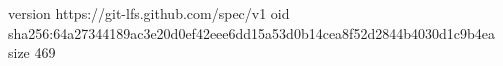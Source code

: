 version https://git-lfs.github.com/spec/v1
oid sha256:64a27344189ac3e20d0ef42eee6dd15a53d0b14cea8f52d2844b4030d1c9b4ea
size 469
